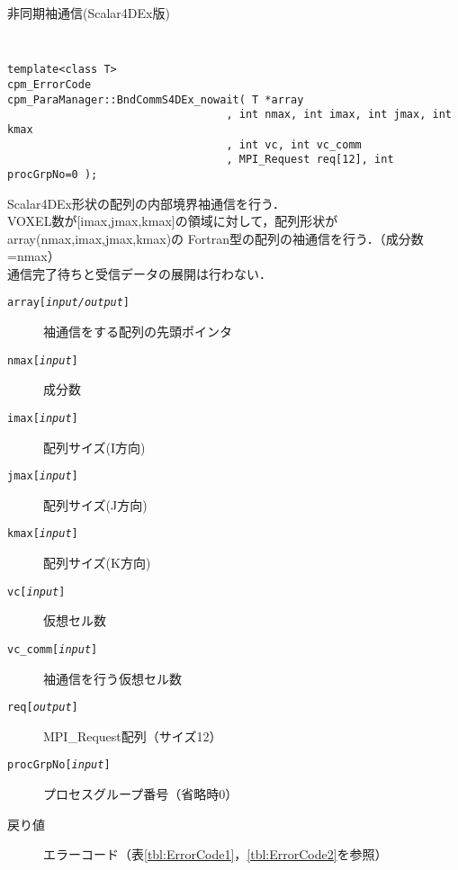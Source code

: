 \begin{spacing}{0.8}
\begin{itembox}[l]{非同期袖通信(Scalar4DEx版)}
{\tt
\begin{verbatim}
template<class T>
cpm_ErrorCode
cpm_ParaManager::BndCommS4DEx_nowait( T *array
                                  , int nmax, int imax, int jmax, int kmax
                                  , int vc, int vc_comm
                                  , MPI_Request req[12], int procGrpNo=0 );
\end{verbatim}
}
Scalar4DEx形状の配列の内部境界袖通信を行う．\\
VOXEL数が[imax,jmax,kmax]の領域に対して，配列形状がarray(nmax,imax,jmax,kmax)の
Fortran型の配列の袖通信を行う．（成分数=nmax）\\
通信完了待ちと受信データの展開は行わない．
\begin{description}
\item[{\tt array[{\it input/output}]}] 袖通信をする配列の先頭ポインタ
\item[{\tt nmax[{\it input}]}] 成分数
\item[{\tt imax[{\it input}]}] 配列サイズ(I方向)
\item[{\tt jmax[{\it input}]}] 配列サイズ(J方向)
\item[{\tt kmax[{\it input}]}] 配列サイズ(K方向)
\item[{\tt vc[{\it input}]}] 仮想セル数
\item[{\tt vc\_comm[{\it input}]}] 袖通信を行う仮想セル数
\item[{\tt req[{\it output}]}] MPI\_Request配列（サイズ12）
\item[{\tt procGrpNo[{\it input}]}] プロセスグループ番号（省略時0）
\\
\item[戻り値] エラーコード（表\ref{tbl:ErrorCode1}，\ref{tbl:ErrorCode2}を参照）
\end{description}
\end{itembox}\\
\end{spacing}

